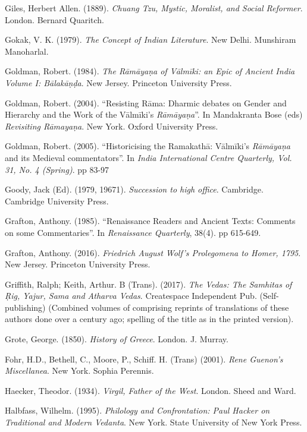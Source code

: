\begin{thebibliography}{99}
Giles, Herbert Allen. (1889). {\sl Chuang Tzu, Mystic, Moralist, and Social Reformer}. London. Bernard Quaritch. 

Gokak, V. K.  (1979). {\sl The Concept of Indian Literature}. New Delhi. Munshiram Manoharlal. 

Goldman, Robert. (1984). {\sl The Rāmāyaṇa of Vālmīki: an Epic of Ancient India Volume I: Bālakāṇḍa}. New Jersey. Princeton University Press. 

Goldman, Robert. (2004). “Resisting Rāma: Dharmic debates on Gender and Hierarchy and the Work of the Vālmīki’s {\sl Rāmāyaṇa}”. In Mandakranta Bose (eds) {\sl Revisiting Rāmayaṇa}. New York. Oxford University Press. 

Goldman, Robert. (2005). “Historicising the Ramakathā: Vālmīki's {\sl Rāmāyaṇa} and its Medieval commentators”. In {\sl India International Centre Quarterly, Vol. 31, No. 4 (Spring)}. pp 83-97

Goody, Jack (Ed). (1979, 19671). {\sl Succession to high office}. Cambridge. Cambridge University Press. 

Grafton, Anthony. (1985). “Renaissance Readers and Ancient Texts: Comments on some Commentaries”. In {\sl Renaissance Quarterly}, 38(4). pp 615-649.

Grafton, Anthony. (2016). {\sl Friedrich August Wolf’s Prolegomena to Homer, 1795}.  New Jersey.  Princeton University Press. 

Griffith, Ralph; Keith, Arthur. B (Trans). (2017). {\sl The Vedas: The Samhitas of Ṛig, Yajur, Sama and Atharva Vedas}. Createspace Independent Pub. (Self-publishing) (Combined volumes of comprising reprints of translations of these authors done over a century ago; spelling of the title as in the printed version).

Grote, George. (1850). {\sl History of Greece}.  London. J. Murray. 

Fohr, H.D., Bethell, C., Moore, P., Schiff. H. (Trans) (2001). {\sl Rene Guenon’s Miscellanea}. New York. Sophia Perennis. 

Haecker, Theodor. (1934). {\sl Virgil, Father of the West}. London. Sheed and Ward. 

Halbfass, Wilhelm. (1995). {\sl Philology and Confrontation: Paul Hacker on Traditional and Modern Vedanta}. New York. State University of New York Press. 


\end{thebibliography}
